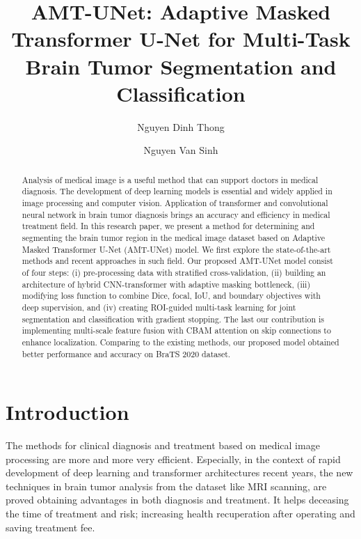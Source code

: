 \documentclass[runningheads]{llncs}
\begin{document}
%
\title{AMT-UNet: Adaptive Masked Transformer U-Net for Multi-Task Brain Tumor Segmentation and Classification}
%
%
\author{Nguyen Dinh Thong \and Nguyen Van Sinh}
%
%
%
\maketitle
%


\begin{abstract}
Analysis of medical image is a useful method that can support doctors in medical diagnosis. The development of deep learning models is essential and widely applied in image processing and computer vision. Application of transformer and convolutional neural network in brain tumor diagnosis brings an accuracy and efficiency in medical treatment field. In this research paper, we present a method for determining and segmenting the brain tumor region in the medical image dataset based on Adaptive Masked Transformer U-Net (AMT-UNet) model. We first explore the state-of-the-art methods and recent approaches in such field. Our proposed AMT-UNet model consist of four steps: (i) pre-processing data with stratified cross-validation, (ii) building an architecture of hybrid CNN-transformer with adaptive masking bottleneck, (iii) modifying loss function to combine Dice, focal, IoU, and boundary objectives with deep supervision, and (iv) creating ROI-guided multi-task learning for joint segmentation and classification with gradient stopping. The last our contribution is implementing multi-scale feature fusion with CBAM attention on skip connections to enhance localization. Comparing to the existing methods, our proposed model obtained better performance and accuracy on BraTS 2020 dataset.

\end{abstract}

%
%
\section{Introduction}

The methods for clinical diagnosis and treatment based on medical image processing are more and more very efficient. Especially, in the context of rapid development of deep learning and transformer architectures recent years, the new techniques in brain tumor analysis from the dataset like MRI scanning, are proved obtaining advantages in both diagnosis and treatment. It helps deceasing the time of treatment and risk; increasing health recuperation after operating and saving treatment fee.
\end{document}
